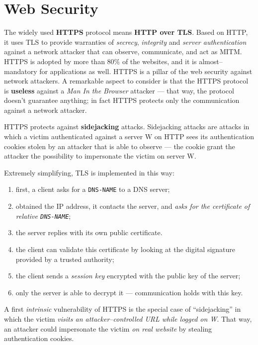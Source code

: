 \documentclass[10pt]{\classname}
\begin{document}
\chapter{Web Security}

The widely used \textbf{HTTPS} protocol means \textbf{HTTP over TLS}. Based on
HTTP, it uses TLS to provide warranties of \emph{secrecy}, \emph{integrity} and
\emph{server authentication} against a network attacker that can observe,
communicate, and act as MITM. HTTPS is adopted by more than $80\%$ of the
websites, and it is almost--mandatory for applications as well. HTTPS is a
pillar of the web security against network attackers. A remarkable aspect to
consider is that the HTTPS protocol is \textbf{useless} against a \emph{Man In
the Browser} attacker --- that way, the protocol doesn't guarantee anything; in
fact HTTPS protects only the communication against a network attacker.

HTTPS protects against \textbf{sidejacking} attacks. Sidejacking attacks are
attacks in which a victim authenticated against a server W on HTTP sees its
authentication cookies stolen by an attacker that is able to observe --- the
cookie grant the attacker the possibility to impersonate the victim on server
W.

Extremely simplifying, TLS is implemented in this way:
\begin{enumerate}
    \item first, a client asks for a \texttt{DNS-NAME} to a DNS server;
    \item obtained the IP address, it contacts the server, and \emph{asks for
        the certificate of relative \texttt{DNS-NAME}};
    \item the server replies with its own public certificate.
    \item the client can validate this certificate by looking at the digital
        signature provided by a trusted authority;
    \item the client sends a \emph{session key} encrypted with the public key
        of the server;
    \item only the server is able to decrypt it --- communication holds with this
        key.
\end{enumerate}

A first \emph{intrinsic} vulnerability of HTTPS is the special case of
``sidejacking'' in which the victim \emph{visits an attacker--controlled URL
while logged on W}. That way, an attacker could impersonate the victim \emph{on
real website} by stealing authentication cookies.
\end{document}
